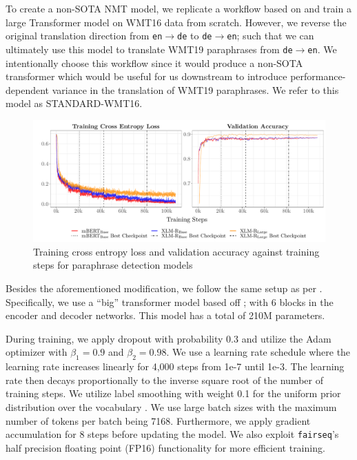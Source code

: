 \documentclass[11pt,a4paper]{article}
\begin{document}
To create a non-SOTA NMT model, we replicate a workflow based on
\citet{ott2018scaling} and train a large Transformer model on WMT16 data from
scratch. However, we reverse the original translation direction from
\texttt{en$\rightarrow$de} to \texttt{de$\rightarrow$en}; such that we can
ultimately use this model to translate WMT19 paraphrases from
\texttt{de$\rightarrow$en}. We intentionally choose this workflow since it would
produce a non-SOTA transformer which would be useful for us downstream to
introduce performance-dependent variance in the translation of WMT19
paraphrases. We refer to this model as STANDARD-WMT16.

\begin{figure}
  \centering \includegraphics[trim={0.7cm 0cm 0cm
    0cm},clip,width=\textwidth]{paraphrase_detection_models_evolution.pdf}
  \caption{Training cross entropy loss and validation accuracy against training
    steps for paraphrase detection models}
  \label{paraphrase_detection_model_evolution}
\end{figure}

Besides the aforementioned modification, we follow the same setup as per
\citet{ott2018scaling}. Specifically, we use a ``big'' transformer model based
off \citet{vaswani2017attention}; with 6 blocks in the encoder and decoder
networks. This model has a total of 210M parameters.

During training, we apply dropout \cite{srivastava2014dropout} with probability
0.3 and utilize the Adam optimizer \cite{kingma2014adam} with $\beta_1 = 0.9$
and $\beta_2=0.98$. We use a learning rate schedule where the learning rate
increases linearly for 4,000 steps from 1e-7 until 1e-3. The learning rate then
decays proportionally to the inverse square root of the number of training
steps. We utilize label smoothing with weight 0.1 for the uniform prior
distribution over the vocabulary \cite{pereyra2017regularizing}. We use large
batch sizes with the maximum number of tokens per batch being 7168. Furthermore,
we apply gradient accumulation for 8 steps before updating the model. We also
exploit \texttt{fairseq}'s half precision floating point (FP16) functionality
for more efficient training.
\end{document}
